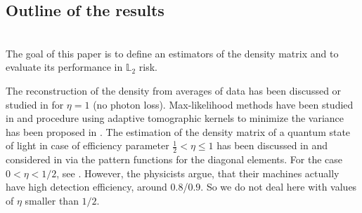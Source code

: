 \documentclass[a4paper]{amsart}
\begin{document}
\subsection{Outline of the results}
\label{Outline.results}
\noindent\\






The goal of this paper is to define an estimators of the density matrix and 
to evaluate its performance in $\mathbb{L}_2$ risk.

The reconstruction of the density from
averages of data has been discussed or studied in
\cite{DAriano.0,DAriano.2,DAriano.3,Artiles&Gill&Guta} for $\eta=1$ (no photon
loss). 
Max-likelihood methods have been studied in
\cite{BDPS,Artiles&Gill&Guta,DMS,Guta} and procedure using adaptive
tomographic kernels to minimize the variance has been proposed in \cite{DP}. The
estimation of the density matrix of a quantum state of light in case of
efficiency parameter $\frac12 < \eta \leq 1$ has been discussed in
\cite{DAriano.1,DMS,DAriano.5} and considered in \cite{Richter} via the pattern
functions for the diagonal elements. For the case $0<\eta <1/2$, see \cite{ABM}.
However, the physicists argue, that their machines actually have high detection
efficiency, around $0.8$/$0.9$. So we do not deal here with values of $\eta$
smaller
than $1/2$.

\end{document}
